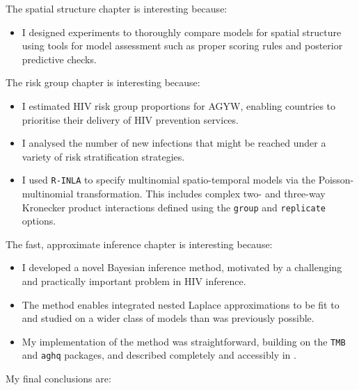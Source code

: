 \documentclass[a4paper, nobind]{templates/ociamthesis}
\providecommand{\tightlist}{%
  \setlength{\itemsep}{0pt}\setlength{\parskip}{0pt}}
\begin{document}
The spatial structure chapter is interesting because:

\begin{itemize}
\tightlist
\item
  I designed experiments to thoroughly compare models for spatial structure using tools for model assessment such as proper scoring rules and posterior predictive checks.
\end{itemize}

The risk group chapter is interesting because:

\begin{itemize}
\tightlist
\item
  I estimated HIV risk group proportions for AGYW, enabling countries to prioritise their delivery of HIV prevention services.
\item
  I analysed the number of new infections that might be reached under a variety of risk stratification strategies.
\item
  I used \texttt{R-INLA} to specify multinomial spatio-temporal models via the Poisson-multinomial transformation. This includes complex two- and three-way Kronecker product interactions defined using the \texttt{group} and \texttt{replicate} options.
\end{itemize}

The fast, approximate inference chapter is interesting because:

\begin{itemize}
\tightlist
\item
  I developed a novel Bayesian inference method, motivated by a challenging and practically important problem in HIV inference.
\item
  The method enables integrated nested Laplace approximations to be fit to and studied on a wider class of models than was previously possible.
\item
  My implementation of the method was straightforward, building on the \texttt{TMB} and \texttt{aghq} packages, and described completely and accessibly in \textcite{howes2023integrated}.
\end{itemize}

My final conclusions are:
\end{document}
